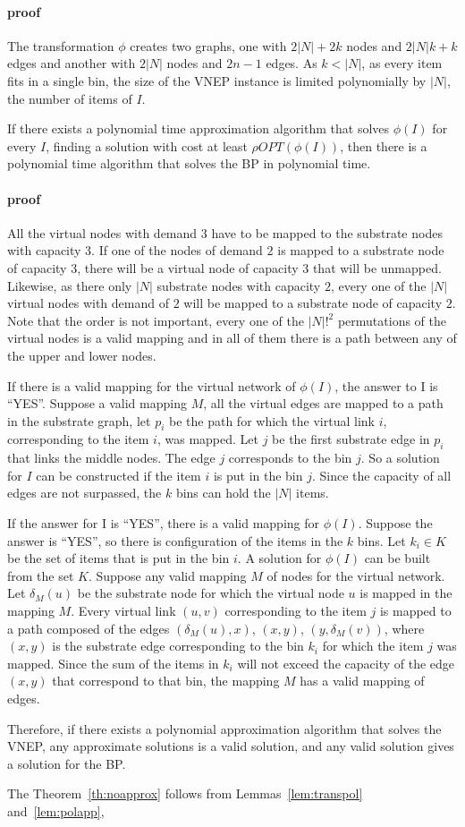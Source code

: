 \paragraph{proof} The transformation $\phi$ creates two graphs, one with $2|N| + 2k$ nodes and $2|N|k + k$ edges and another with $2|N|$ nodes and $2n - 1$ edges. As $k < |N|$, as every item fits in a single bin, the size of the VNEP instance is limited polynomially by $|N|$, the number of items of $I$.

\begin{lemma} \label{lem:polapp}
  If there exists a polynomial time approximation algorithm that solves $\phi(I)$ for every $I$, finding a solution with cost at least $\rho OPT(\phi(I))$, then there is a polynomial time algorithm that solves the BP in polynomial time.
\end{lemma}

\paragraph{proof} All the virtual nodes with demand $3$ have to be mapped to the substrate nodes with capacity $3$. If one of the nodes of demand $2$ is mapped to a substrate node of capacity $3$, there will be a virtual node of capacity $3$ that will be unmapped. Likewise, as there only $|N|$ substrate nodes with capacity $2$, every one of the $|N|$ virtual nodes with demand of $2$ will be mapped to a substrate node of capacity $2$. Note that the order is not important, every one of the $|N|!^{2} $ permutations of the virtual nodes is a valid mapping and in all of them there is a path between any of the upper and lower nodes.

If there is a valid mapping for the virtual network of $\phi(I)$, the answer to I is ``YES''. Suppose a valid mapping $M$, all the virtual edges are mapped to a path in the substrate graph, let $p_{i}$ be the path for which the virtual link $i$, corresponding to the item $i$, was mapped. Let $j$ be the first substrate edge in $p_{i}$ that links the middle nodes. The edge $j$ corresponds to the bin $j$. So a solution for $I$ can be constructed if the item $i$ is put in the bin $j$. Since the capacity of all edges are not surpassed, the $k$ bins can hold the $|N|$ items.

If the answer for I is ``YES'', there is a valid mapping for $\phi(I)$. Suppose the answer is ``YES'', so there is configuration of the items in the $k$ bins. Let $k_{i} \in K$ be the set of items that is put in the bin $i$. A solution for $\phi(I)$ can be built from the set $K$. Suppose any valid mapping $M$ of nodes for the virtual network. Let $\delta_{M}(u)$ be the substrate node for which the virtual node $u$ is mapped in the mapping $M$. Every virtual link $(u,v)$ corresponding to the item $j$ is mapped to a path composed of the edges $(\delta_{M}(u), x)$, $(x,y)$, $(y,\delta_{M}(v))$, where $(x,y)$ is the substrate edge corresponding to the bin $k_{i}$ for which the item $j$ was mapped. Since the sum of the items in $k_{i}$ will not exceed the capacity of the edge $(x,y)$ that correspond to that bin, the mapping $M$ has a valid mapping of edges.

Therefore, if there exists a polynomial approximation algorithm that solves the VNEP, any approximate solutions is a valid solution, and any valid solution gives a solution for the BP.

The Theorem~\ref{th:noapprox} follows from Lemmas~\ref{lem:transpol} and~\ref{lem:polapp}, 
